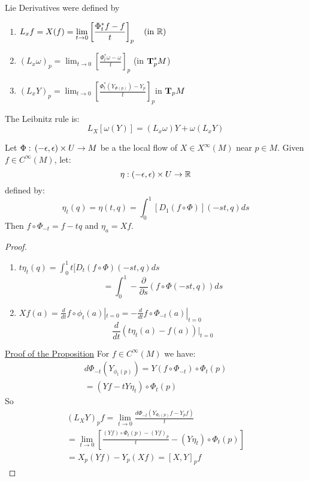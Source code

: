 Lie Derivatives were defined by
\begin{enumerate}
\item $\displaystyle L_xf = X(f) = \lim_{t\to 0} \left[ \frac{\Phi_t^* f-f}{t} \right]_p \quad (\text{in } \mathbb{R})$
\item $\displaystyle (L_x\omega)_p =  \lim_{t\to 0} \left[ \frac{\Phi_t^* \omega-\omega}{t} \right]_p $ (in $\text{\textbf{T}}^*_p M$)
\item $\displaystyle (L_xY)_p = \lim_{t\to 0} \left[ \frac{\Phi_t^* (Y_{\Phi(p)})-Y_p}{t} \right]_p $in $\text{\textbf{T}}_pM$
\end{enumerate}

\begin{ddef}
The Leibnitz rule is:
$$L_X[\omega(Y)] = (L_x\omega) Y + \omega(L_xY)$$
\end{ddef}


\begin{lema}
Let $\Phi :\, (-\epsilon, \epsilon) \times U \to M$ be a the local flow of $X\in X^\infty(M)$ near $p\in M$. Given $f\in C^\infty(M)$, let:
$$\eta: (-\epsilon,\epsilon)\times U \to \mathbb{R}$$
defined by:
$$\eta_t(q) = \eta(t,q) = \int_0^1 [D_1(f\circ \Phi)] (-st,q) ds$$
Then $f\circ \Phi_{-t} = f-tq$ and $\eta_a= Xf$.
\begin{proof}
    \begin{enumerate}
        \item $t\eta_t(q) = \int_0^1 t[D_t(f\circ \Phi)(-st,q) ds$
                $$= \int_0^1 -\frac{\partial }{\partial s} (f\circ \Phi (-st,q))ds$$
            \item $\displaystyle Xf(a) = \frac{d}{dt} f\circ \phi_t(a) |_{t=0} = -\frac{d}{dt} f\circ \Phi_{-t} (a) |_{t=0}$
                $$\frac{d}{dt}\left( t\eta_t(a) - f(a)\right) |_{t=0}$$
        \end{enumerate}
        \underline{Proof of the Proposition}
        For $f\in C^\infty (M)$ we have:
        \begin{gather*}
            d\Phi_{-t} (Y_{\phi_t(p)}) = Y(f\circ \Phi_{-t}) \circ \Phi_t(p)\\
            = (Yf - tY\eta_t)\circ \Phi_t(p)
        \end{gather*}
        So 
    \begin{gather*}
    (L_XY)_p f = \lim_{t\to 0} \frac{d\Phi_{-t} (Y_{\Phi_t(p)}f - Y_p f)}{t}\\
    = \lim_{t\to 0} \left[ \frac{(Yf) \circ \Phi_t(p) - (Yf)_p}{t} - (Y\eta_t)\circ \Phi_t(p) \right]\\
    = X_p(Yf) - Y_p(Xf) = [X,Y]_p f
\end{gather*}
\end{proof}
\end{lema}
 
